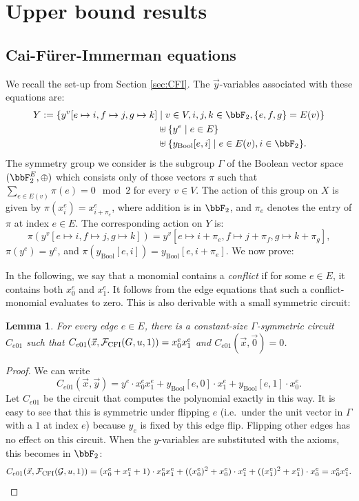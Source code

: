 \documentclass[10pt,a4paper]{article}
\newtheorem{lemma}[theorem]{Lemma}
\newcommand{\Ff}{{\cal F}}
\newcommand{\Gg}{{\cal G}}
\newcommand{\CFI}{\Ff_{\mathrm{CFI}}}
\begin{document}
\section{Upper bound results }


\subsection{Cai-Fürer-Immerman equations}
We recall the set-up from Section \ref{sec:CFI}.
\CFIdefinition*
The $\vec y$-variables associated with these equations are:
\begin{align*}
	Y := \{ y^v[e \mapsto i,f \mapsto j,g \mapsto k] &\mid v \in V, i,j,k \in \bbF_2, \{e,f,g\} = E(v)   \} \\
	& \uplus \{ y^e \mid e \in E \} \\
	& \uplus \{ y_{\text{Bool}}[e,i] \mid e \in E(v), i \in \bbF_2  \}  .
\end{align*}
The symmetry group we consider is the subgroup $\Gamma$ of the Boolean vector space $(\bbF_2^{E}, \oplus)$ which consists only of those vectors $\pi$ such that $\sum_{e \in E(v)} \pi(e) = 0 \mod 2$ for every $v \in V$. 
The action of this group on $X$ is given by $\pi(x^e_i) = x^e_{i+\pi_e}$, where addition is in $\bbF_2$, and $\pi_e$ denotes the entry of $\pi$ at index $e \in E$. 
The corresponding action on $Y$ is:
\[
\pi(y^v[e \mapsto i,f \mapsto j,g \mapsto k]) = y^v[e \mapsto i+\pi_{e},f \mapsto j+\pi_{f},g \mapsto k+\pi_{g}],
\]
$\pi(y^e) = y^e$, and $\pi(y_{\text{Bool}}[e,i]) = y_{\text{Bool}}[e,i+\pi_e]$. We now prove:


\CFIupperbound*



In the following, we say that a monomial contains a \emph{conflict} if for some $e \in E$, it contains both $x^e_0$ and $x^e_1$. It follows from the edge equations that such a conflict-monomial evaluates to zero. This is also derivable with a small symmetric circuit:
\begin{lemma}
	\label{lem:symmetricCircuitForE01}
	For every edge $e \in E$, there is a constant-size $\Gamma$-symmetric circuit $C_{e01}$ such that $C_{e01}(\vec x, \CFI(G, u, 1)) = x^e_0x^e_1$ and $C_{e01}(\vec x, \vec 0) = 0$.
\end{lemma}
\begin{proof}
	We can write
	\[
	C_{e01}(\vec x, \vec y) = y^e \cdot x^e_0x^e_1 + y_{\text{Bool}}[e,0] \cdot x^e_1 + y_{\text{Bool}}[e,1] \cdot x^e_0.
	\]
	Let $C_{e01}$ be the circuit that computes the polynomial exactly in this way.
	It is easy to see that this is symmetric under flipping $e$ (i.e.\ under the unit vector in $\Gamma$ with a $1$ at index $e$) because $y_e$ is fixed by this edge flip. Flipping other edges has no effect on this circuit. When the $y$-variables are substituted with the axioms, this becomes in $\bbF_2$:
	\[
	C_{e01}(\vec x,  \CFI(\Gg, u, 1)) = (x^e_0 + x^e_1 +1) \cdot x^e_0x^e_1  + ((x^e_0)^2 + x^e_0) \cdot x^e_1 + ((x^e_1)^2 + x^e_1) \cdot x^e_0 =  x^e_0x^e_1\\.
	\]
\end{proof}	
\end{document}
